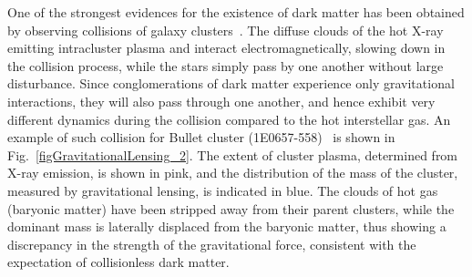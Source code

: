 One of the strongest evidences for the existence of dark matter has been obtained by observing collisions of galaxy clusters~\cite{GravitationalLensing_BulletCluster, GravitationalLensing_Abell, GravitationalLensing_MACS1, GravitationalLensing_MACS2}. The diffuse clouds of the hot X-ray emitting intracluster plasma and interact electromagnetically, slowing down in the collision process, while the stars simply pass by one another without large disturbance. Since conglomerations of dark matter experience only gravitational interactions, they will also pass through one another, and hence exhibit very different dynamics during the collision compared to the hot interstellar gas. An example of such collision for Bullet cluster (1E0657-558)~\cite{GravitationalLensing_BulletCluster} is shown in Fig.~\ref{figGravitationalLensing_2}. The extent of cluster plasma, determined from X-ray emission, is shown in pink, and the distribution of the mass of the cluster, measured by gravitational lensing, is indicated in blue. The clouds of hot gas (baryonic matter) have been stripped away from their parent clusters, while the dominant mass is laterally displaced from the baryonic matter, thus showing a discrepancy in the strength of the gravitational force, consistent with the expectation of collisionless dark matter.

